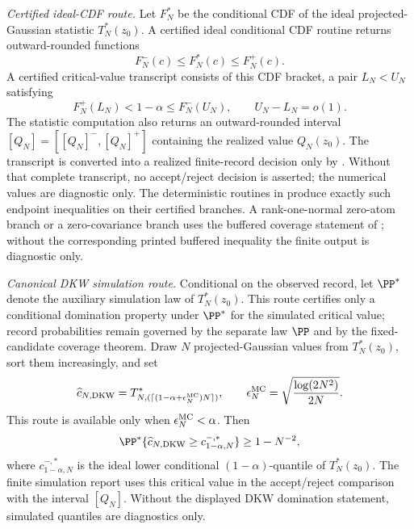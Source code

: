\begin{definition}
\emph{Certified ideal-CDF route.}  Let \(F_N^\ast\) be the conditional CDF of
the ideal projected-Gaussian statistic \(T_N^\ast(z_0)\).  A certified ideal
conditional CDF routine returns outward-rounded functions
\[
F_N^-(c)\le F_N^\ast(c)\le F_N^+(c).
\]
A certified critical-value transcript consists of this CDF bracket, a pair
\(L_N<U_N\) satisfying
\[
F_N^+(L_N)<1-\alpha\le F_N^-(U_N),\qquad
U_N-L_N=o(1).
\]
The statistic computation also returns an outward-rounded interval
\([Q_N]=[[Q_N]^-,[Q_N]^+]\) containing the realized value \(Q_N(z_0)\).
The transcript is converted into a realized finite-record decision only by
.  Without that complete
transcript, no accept/reject decision is asserted; the numerical values are
diagnostic only.
The deterministic routines in
produce exactly such endpoint inequalities on their certified branches.  A
rank-one-normal zero-atom branch or a zero-covariance branch uses the buffered
coverage statement of ;
without the corresponding printed buffered inequality the finite output is
diagnostic only.

\emph{Canonical DKW simulation route.}  Conditional on the observed record,
let \(\PP^\ast\) denote the auxiliary simulation law of
\(T_N^\ast(z_0)\).  This route certifies only a conditional domination
property under \(\PP^\ast\) for the simulated critical value; record
probabilities remain governed by the separate law \(\PP\) and by the
fixed-candidate coverage theorem.  Draw \(N\) projected-Gaussian values from
\(T_N^\ast(z_0)\), sort them increasingly, and set
\[
\widehat c_{N,\mathrm{DKW}}
=T^*_{N,(\lceil(1-\alpha+\epsilon_N^{\rm MC})N\rceil)},\qquad
\epsilon_N^{\rm MC}=\sqrt{\frac{\log(2N^2)}{2N}} .
\]
This route is available only when \(\epsilon_N^{\rm MC}<\alpha\).  Then
\[
\PP^\ast\{\widehat c_{N,\mathrm{DKW}}
\ge c_{1-\alpha,N}^{-,*}\}\ge1-N^{-2},
\]
where \(c_{1-\alpha,N}^{-,*}\) is the ideal lower conditional
\((1-\alpha)\)-quantile of \(T_N^\ast(z_0)\).  The finite simulation report
uses this critical value in the accept/reject comparison with the interval
\([Q_N]\).  Without the displayed DKW domination statement, simulated
quantiles are diagnostics only.
\end{definition}

